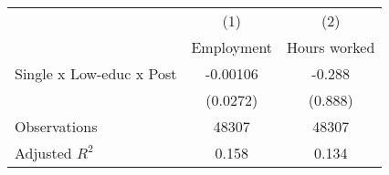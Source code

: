 {
\def\sym#1{\ifmmode^{#1}\else\(^{#1}\)\fi}
\begin{tabular}{l*{2}{c}}
\hline\hline
                &\multicolumn{1}{c}{(1)}&\multicolumn{1}{c}{(2)}\\
                &\multicolumn{1}{c}{Employment}&\multicolumn{1}{c}{Hours worked}\\
\hline
Single x Low-educ x Post& -0.00106         &   -0.288         \\
                & (0.0272)         &  (0.888)         \\
\hline
Observations    &    48307         &    48307         \\
Adjusted \(R^{2}\)&    0.158         &    0.134         \\
\hline\hline
\end{tabular}
}
